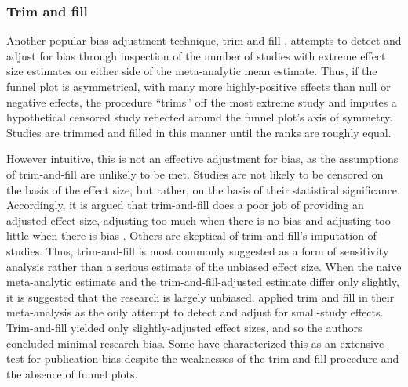 \documentclass[man]{apa6}
\begin{document}
\subsubsection{Trim and fill}
Another popular bias-adjustment technique, trim-and-fill \citep{Duval:Tweedie:2000}, attempts to detect and adjust for bias through inspection of the number of studies with extreme effect size estimates on either side of the meta-analytic mean estimate. Thus, if the funnel plot is asymmetrical, with many more highly-positive effects than null or negative effects, the procedure ``trims'' off the most extreme study and imputes a hypothetical censored study reflected around the funnel plot's axis of symmetry. Studies are trimmed and filled in this manner until the ranks are roughly equal. 

However intuitive, this is not an effective adjustment for bias, as the assumptions of trim-and-fill are unlikely to be met. Studies are not likely to be censored on the basis of the effect size, but rather, on the basis of their statistical significance. Accordingly, it is argued that trim-and-fill does a poor job of providing an adjusted effect size, adjusting too much when there is no bias and adjusting too little when there is bias \citep{Lakens:2014,Simonsohn:etal:2014b}. %
Others are skeptical of trim-and-fill's imputation of studies. %
Thus, trim-and-fill is most commonly suggested as a form of sensitivity analysis rather than a serious estimate of the unbiased effect size. When the naive meta-analytic estimate and the trim-and-fill-adjusted estimate differ only slightly, it is suggested that the research is largely unbiased.
\citet{Anderson:etal:2010} applied trim and fill in their meta-analysis as the only attempt to detect and adjust for small-study effects. Trim-and-fill yielded only slightly-adjusted effect sizes, and so the authors concluded minimal research bias.  %
Some have characterized this as an extensive test for publication bias \citep[][pg. 51]{Bushman:Huesmann:2014} despite the weaknesses of the trim and fill procedure and the absence of funnel plots.
\end{document}
